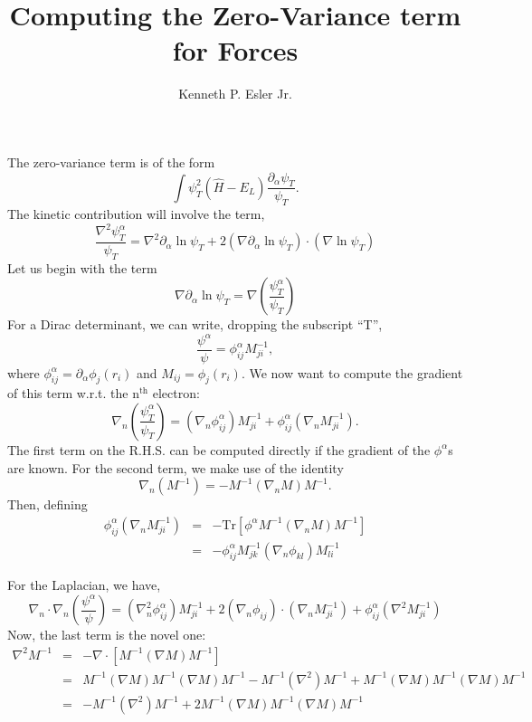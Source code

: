 \documentclass{article}
\author{Kenneth P. Esler Jr.}
\title{Computing the Zero-Variance term for Forces}
\begin{document}
\maketitle
The zero-variance term is of the form
\begin{equation}
\int \psi_T^2 (\hat{H} - E_L) \frac{\partial_\alpha \psi_T}{\psi_T}.
\end{equation}
The kinetic contribution will involve the term,
\begin{equation}
\frac{\nabla^2 \psi_T^\alpha}{\psi_T} = \nabla^2 \partial_\alpha \ln
\psi_T + 2 (\nabla \partial_\alpha \ln \psi_T)\cdot (\nabla \ln \psi_T)
\end{equation}
Let us begin with the term
\begin{equation}
\nabla \partial_\alpha \ln \psi_T =
\nabla\left(\frac{\psi^\alpha_T}{\psi_T}\right)
\end{equation}
For a Dirac determinant, we can write, dropping the subscript ``T'', 
\begin{equation}
\frac{\psi^\alpha}{\psi} = \phi^\alpha_{ij} M^{-1}_{ji},
\end{equation}
where $\phi^{\alpha}_{ij} = \partial_\alpha \phi_j(r_i)$ and $M_{ij} =
\phi_j(r_i)$.  We now want to compute the gradient of this term
w.r.t. the n$^\text{th}$ electron:
\begin{equation}
\nabla_n \left(\frac{\psi^\alpha_T}{\psi_T}\right)  = 
(\nabla_n \phi_{ij}^\alpha)M^{-1}_{ji} + \phi^\alpha_{ij} (\nabla_n M^{-1}_{ji}).
\end{equation}
The first term on the R.H.S. can be computed directly if the gradient
of the $\phi^\alpha$s are known.  For the second term, we make use of
the identity 
\begin{equation}
\nabla_n (M^{-1}) = -M^{-1} (\nabla_n M) M^{-1}.
\end{equation}
Then, defining 
\begin{eqnarray}
\phi^\alpha_{ij} (\nabla_n M^{-1}_{ji}) & = & -\text{Tr}\left[\phi^\alpha M^{-1}
  (\nabla_n M)M^{-1}\right] \\
& = & -\phi^\alpha_{ij} M^{-1}_{jk} (\nabla_n \phi_{kl}) M^{-1}_{li}
\end{eqnarray}

For the Laplacian, we have,
\begin{equation}
\nabla_n\cdot\nabla_n\left(\frac{\psi^\alpha}{\psi}\right) =
(\nabla_n^2\phi_{ij}^\alpha)M^{-1}_{ji} +
2(\nabla_n\phi_{ij})\cdot(\nabla_n M^{-1}_{ji}) +
\phi^\alpha_{ij}(\nabla^2 M^{-1}_{ji})
\end{equation} 
Now, the last term is the novel one:
\begin{eqnarray}
\nabla^2 M^{-1} & = & -\nabla\cdot [M^{-1}(\nabla M) M^{-1}] \\
& = & M^{-1}(\nabla M)M^{-1}(\nabla M) M^{-1} - M^{-1}(\nabla^2)M^{-1}
+ M^{-1}(\nabla M) M^{-1} (\nabla M) M^{-1} \\
& = & -M^{-1} (\nabla^2) M^{-1} + 2 M^{-1}(\nabla M) M^{-1}(\nabla M) M^{-1}
\end{eqnarray}
\end{document}
